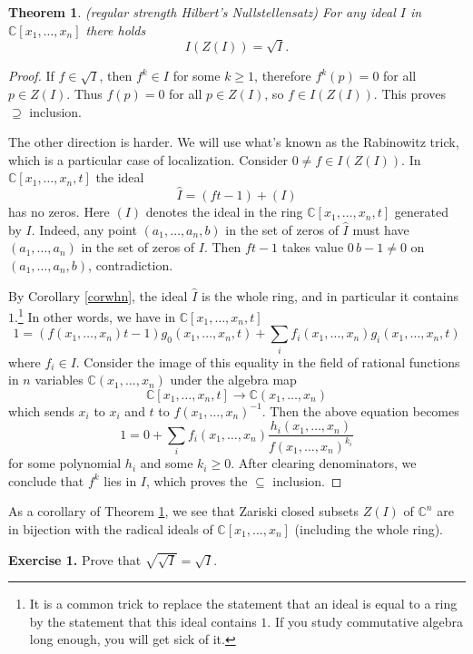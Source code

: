 \documentclass[11pt]{article}
\numberwithin{equation}{section}
\numberwithin{footnote}{section}
\newtheorem{thm}{Theorem}[section]
\newcommand{\C}{{\mathbb C}}
\begin{document}
\smallskip
\begin{thm}\label{hn}(regular strength Hilbert's Nullstellensatz)
For any ideal $I$ in $\C[x_1,\ldots,x_n]$ there holds
$$
I(Z(I))=\sqrt I.
$$
\end{thm}

\begin{proof}
If $f\in \sqrt I$, then $f^k\in I$ for some $k\geq 1$, therefore $f^k(p)=0$ for all $p\in Z(I)$. Thus $f(p)=0$ for all $p\in Z(I)$, so $f\in I(Z(I))$. This proves $\supseteq$ inclusion.

The other direction is harder. We will use what's known as the Rabinowitz trick, which is a particular case of localization. Consider $0\neq f\in I(Z(I))$. In $\C[x_1,\ldots,x_n,t]$ the ideal 
$$\hat I = (ft-1)+(I)
$$
has no zeros. Here $(I)$ denotes the ideal in the ring $ \C[x_1,\ldots,x_n,t]$ generated by $I$. Indeed, any point $(a_1,\ldots,a_n,b)$ in the set of zeros of  $\hat I$ must have $(a_1,\ldots,a_n)$ in the set of zeros of $I$. Then $ft-1$ takes value $0\,b-1\neq 0$ on $(a_1,\ldots,a_n,b)$, contradiction.

By Corollary \ref{corwhn}, the ideal $\hat I$ is the whole ring, and in particular it contains $1$.\footnote{ It is a common trick to replace the statement that an ideal is equal to a ring by the statement that this ideal contains $1$. If you study commutative algebra long enough, you will get sick of it.}
In other words, we have in $\C[x_1,\ldots,x_n,t]$
$$
1 = (f(x_1,\ldots,x_n)t-1)g_0(x_1,\ldots,x_n,t) + \sum_i f_i(x_1,\ldots,x_n) g_i(x_1,\ldots,x_n,t)
$$
where $f_i\in I$. 
Consider the image of this equality in the field of rational functions in $n$ variables $\C(x_1,\ldots,x_n)$ under the algebra map 
$$\C[x_1,\ldots,x_n,t]\to \C(x_1,\ldots,x_n)$$which sends $x_i$ to $x_i$ and $t$ to 
$f(x_1,\ldots,x_n)^{-1}$. Then the above equation becomes
$$
1 = 0 + \sum_i f_i(x_1,\ldots,x_n) \frac { h_i(x_1,\ldots,x_n) }{ f(x_1,\ldots,x_n)^{k_i}}
$$
for some polynomial $h_i$ and some $k_i\geq 0$.
After clearing denominators, we conclude that $f^k$ lies in $I$, which proves the $\subseteq$ inclusion.
\end{proof}

As a corollary of Theorem \ref{hn}, we see that Zariski closed subsets $Z(I)$ of $\C^n$ are in bijection with the radical ideals of $\C[x_1,\ldots,x_n]$ (including the whole ring).

\smallskip

{\bf Exercise 1.} Prove that $\sqrt{\sqrt I} = \sqrt{I} $.
\end{document}
